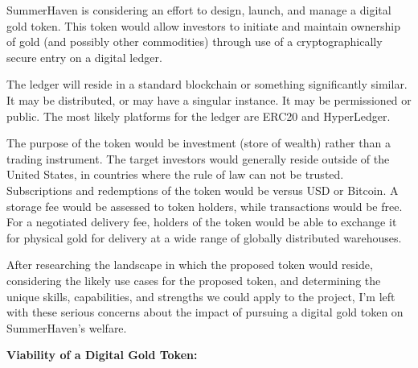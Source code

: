 \documentclass[letterpaper,11pt]{texMemo} %
\begin{document}
\maketitle %


SummerHaven is considering an effort to design, launch, and manage a digital gold token.  This token would allow investors to initiate and maintain ownership of gold (and possibly other commodities) through use of a cryptographically secure entry on a digital ledger.  

The ledger will reside in a standard blockchain or something significantly similar. It may be distributed, or may have a singular instance.  It may be permissioned or  public.  The most likely platforms for the ledger are ERC20 and HyperLedger.

The purpose of the token would be investment (store of wealth) rather than a trading instrument.  The target investors would generally reside outside of the United States, in countries where the rule of law can not be trusted.  Subscriptions and redemptions of the token would be versus USD or Bitcoin.  A storage fee would be assessed to token holders, while transactions would be free.  For a negotiated delivery fee, holders of the token would be able to exchange it for physical gold for delivery at a wide range of globally distributed warehouses.  


After researching the landscape in which the proposed token would reside, considering the likely use cases for the proposed token, and determining the unique skills, capabilities, and strengths we could apply to the project, I'm left with these serious concerns about the impact of pursuing a digital gold token on SummerHaven's welfare.

\vspace{0.5cm}

\textbf{Viability of a Digital Gold Token:}
\end{document}
